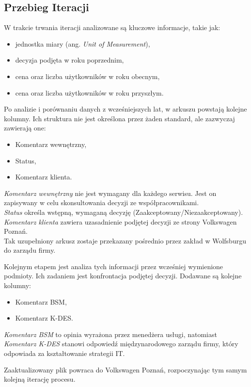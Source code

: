 \subsection{Przebieg Iteracji}
W trakcie trwania iteracji analizowane są kluczowe informacje, takie jak:
\begin{itemize}
    \item jednostka miary (ang. \emph{Unit of Measurement}),
    \item decyzja podjęta w roku poprzednim,
    \item cena oraz liczba użytkowników w roku obecnym,
    \item cena oraz liczba użytkowników w roku przyszłym.
\end{itemize}
Po analizie i porównaniu danych z wcześniejszych lat, w arkuszu powstają kolejne kolumny. Ich struktura nie jest określona przez żaden standard, ale zazwyczaj zawierają one:
\begin{itemize}
    \item Komentarz wewnętrzny,
    \item Status,
    \item Komentarz klienta.
\end{itemize}

\noindent\emph{Komentarz wewnętrzny} nie jest wymagany dla każdego serwisu. Jest on zapisywany w celu skonsultowania decyzji ze współpracownikami.\\ \emph{Status} określa wstępną, wymaganą decyzję (Zaakceptowany/Niezaakceptowany).\\ \emph{Komentarz klienta} zawiera uzasadnienie podjętej decyzji ze strony Volkswagen Poznań.\\Tak uzupełniony arkusz zostaje przekazany pośrednio przez zakład w Wolfsburgu do zarządu firmy. \par
Kolejnym etapem jest analiza tych informacji przez wcześniej wymienione podmioty. Ich zadaniem jest konfrontacja podjętej decyzji. Dodawane są kolejne kolumny:
\begin{itemize}
    \item Komentarz BSM,
    \item Komentarz K-DES.
\end{itemize}

\noindent\emph{Komentarz BSM} to opinia wyrażona przez menedżera usługi, natomiast \emph{Komentarz K-DES} stanowi odpowiedź międzynarodowego zarządu firmy, który odpowiada za kształtowanie strategii IT.\par
Zaaktualizowany plik powraca do Volkswagen Poznań, rozpoczynając tym samym kolejną iterację procesu.






